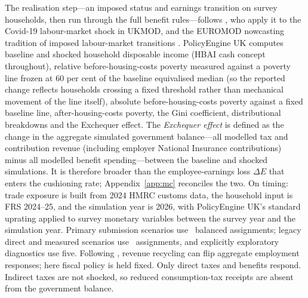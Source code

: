 The realisation step---an imposed status and earnings transition on survey households, then run through the full benefit rules---follows \citet{brewertasseva2021}, who apply it to the Covid-19 labour-market shock in UKMOD, and the EUROMOD nowcasting tradition of imposed labour-market transitions \citep{navicke2013}. PolicyEngine UK computes baseline and shocked household disposable income (HBAI cash concept throughout), relative before-housing-costs poverty measured against a poverty line frozen at 60 per cent of the baseline equivalised median (so the reported change reflects households crossing a fixed threshold rather than mechanical movement of the line itself), absolute before-housing-costs poverty against a fixed baseline line, after-housing-costs poverty, the Gini coefficient, distributional breakdowns and the Exchequer effect. The \emph{Exchequer effect} is defined as the change in the aggregate simulated government balance---all modelled tax and contribution revenue (including employer National Insurance contributions) minus all modelled benefit spending---between the baseline and shocked simulations. It is therefore broader than the employee-earnings loss $\Delta E$ that enters the cushioning rate; Appendix~\ref{app:mc} reconciles the two. On timing: trade exposure is built from 2024 HMRC customs data, the household input is FRS 2024--25, and the simulation year is 2026, with PolicyEngine UK's standard uprating applied to survey monetary variables between the survey year and the simulation year. Primary submission scenarios use \SubmissionDraws\ balanced assignments; legacy direct and measured scenarios use \ProductionDraws\ assignments, and explicitly exploratory diagnostics use five. Following \citet{ignatenko2025}, revenue recycling can flip aggregate employment responses; here fiscal policy is held fixed. Only direct taxes and benefits respond. Indirect taxes are not shocked, so reduced consumption-tax receipts are absent from the government balance.
